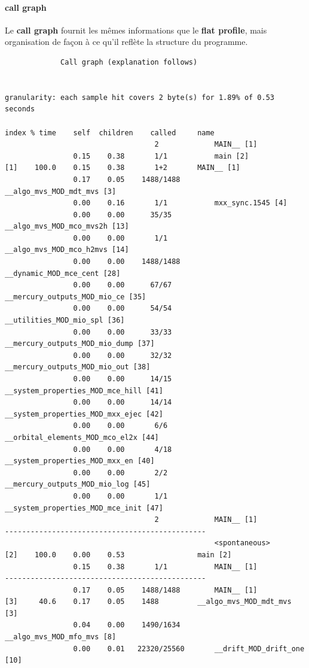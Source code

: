 \documentclass[a4paper,twoside]{article}
\begin{document}
\paragraph{call graph}
Le \textbf{call graph} fournit les mêmes informations que le \textbf{flat profile}, mais organisation de façon à ce qu'il reflète la structure du programme. 

\begin{verbatim}
		     Call graph (explanation follows)


granularity: each sample hit covers 2 byte(s) for 1.89% of 0.53 seconds

index % time    self  children    called     name
                                   2             MAIN__ [1]
                0.15    0.38       1/1           main [2]
[1]    100.0    0.15    0.38       1+2       MAIN__ [1]
                0.17    0.05    1488/1488        __algo_mvs_MOD_mdt_mvs [3]
                0.00    0.16       1/1           mxx_sync.1545 [4]
                0.00    0.00      35/35          __algo_mvs_MOD_mco_mvs2h [13]
                0.00    0.00       1/1           __algo_mvs_MOD_mco_h2mvs [14]
                0.00    0.00    1488/1488        __dynamic_MOD_mce_cent [28]
                0.00    0.00      67/67          __mercury_outputs_MOD_mio_ce [35]
                0.00    0.00      54/54          __utilities_MOD_mio_spl [36]
                0.00    0.00      33/33          __mercury_outputs_MOD_mio_dump [37]
                0.00    0.00      32/32          __mercury_outputs_MOD_mio_out [38]
                0.00    0.00      14/15          __system_properties_MOD_mce_hill [41]
                0.00    0.00      14/14          __system_properties_MOD_mxx_ejec [42]
                0.00    0.00       6/6           __orbital_elements_MOD_mco_el2x [44]
                0.00    0.00       4/18          __system_properties_MOD_mxx_en [40]
                0.00    0.00       2/2           __mercury_outputs_MOD_mio_log [45]
                0.00    0.00       1/1           __system_properties_MOD_mce_init [47]
                                   2             MAIN__ [1]
-----------------------------------------------
                                                 <spontaneous>
[2]    100.0    0.00    0.53                 main [2]
                0.15    0.38       1/1           MAIN__ [1]
-----------------------------------------------
                0.17    0.05    1488/1488        MAIN__ [1]
[3]     40.6    0.17    0.05    1488         __algo_mvs_MOD_mdt_mvs [3]
                0.04    0.00    1490/1634        __algo_mvs_MOD_mfo_mvs [8]
                0.00    0.01   22320/25560       __drift_MOD_drift_one [10]
\end{verbatim}
\end{document}
